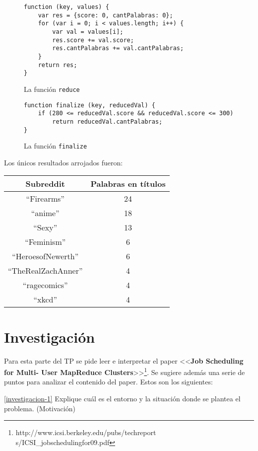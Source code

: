 \documentclass[11pt, a4paper, twoside]{article}
\begin{document}
\begin{figure}[H]
\centering
\begin{verbatim}
function (key, values) {
    var res = {score: 0, cantPalabras: 0};
    for (var i = 0; i < values.length; i++) {
        var val = values[i];
        res.score += val.score;
        res.cantPalabras += val.cantPalabras;
    }
    return res;
}
\end{verbatim}
\caption{La función \texttt{reduce}}
\end{figure}

\begin{figure}[H]
\centering
\begin{verbatim}
function finalize (key, reducedVal) {
    if (280 <= reducedVal.score && reducedVal.score <= 300)
        return reducedVal.cantPalabras;
}
\end{verbatim}
\caption{La función \texttt{finalize}}
\end{figure}


Los únicos resultados arrojados fueron:

\begin{center}
  \begin{tabular}{c|c}
    \textbf{Subreddit} & \textbf{Palabras en títulos} \\ \hline
    ``Firearms'' & 24 \\
    ``anime'' & 18 \\
    ``Sexy'' & 13 \\
    ``Feminism'' & 6 \\
    ``HeroesofNewerth'' & 6 \\
    ``TheRealZachAnner'' & 4 \\
    ``ragecomics'' & 4 \\
    ``xkcd'' & 4 \\
  \end{tabular}
\end{center}

\clearpage
{}
\section{Investigación}
Para esta parte del TP se pide leer e interpretar el paper <<\textbf{Job
Scheduling for Multi- User MapReduce
Clusters}>>\footnote{http://www.icsi.berkeley.edu/pubs/techreport
s/ICSI\_jobschedulingfor09.pdf}. Se sugiere además una serie de puntos
para analizar el contenido del paper. Estos son los siguientes:

\vspace{3em}
\ref{investigacion-1} Explique cuál es el entorno y la situación donde se plantea el problema. (Motivación)
\end{document}
